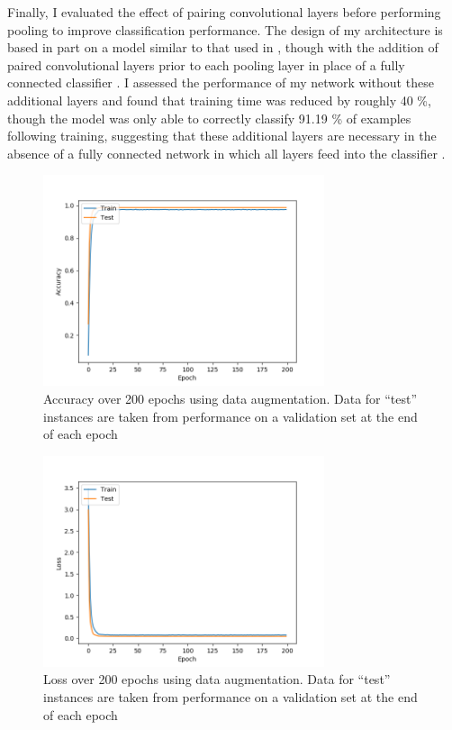 \documentclass[letterpaper,twocolumn,10pt]{article}
\begin{document}
Finally, I evaluated the effect of pairing convolutional layers before performing pooling to improve classification performance. The design of my architecture is based in part on a model similar to that used in \cite{sermanet_convolutional_2012}, though with the addition of paired convolutional layers prior to each pooling layer in place of a fully connected classifier \cite{keras_traffic}. I assessed the performance of my network without these additional layers and found that training time was reduced by roughly 40 \%, though the model was only able to correctly classify 91.19 \% of examples following training, suggesting that these additional layers are necessary in the absence of a fully connected network in which all layers feed into the classifier \cite{sermanet_convolutional_2012}.

\begin{figure}
\includegraphics[width=3.25in]{accuracy}
\caption{Accuracy over 200 epochs using data augmentation. Data for ``test'' instances are taken from performance on a validation set at the end of each epoch}
\end{figure}

\begin{figure}
\includegraphics[width=3.25in]{loss}
\caption{Loss over 200 epochs using data augmentation. Data for ``test'' instances are taken from performance on a validation set at the end of each epoch}
\end{figure}
\end{document}
